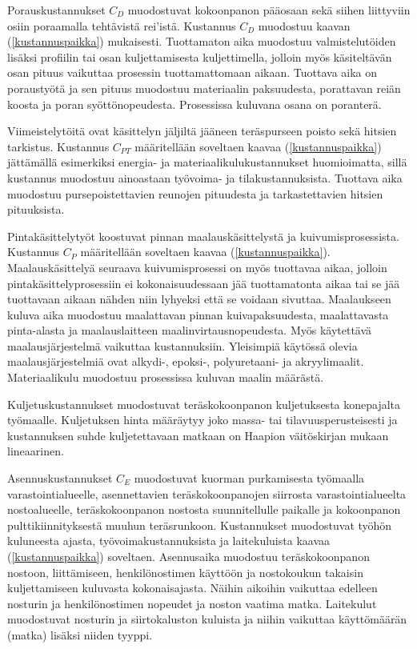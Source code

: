 \documentclass[12pt]{article}
\newenvironment{content}{\pagenumbering{arabic}}{}
\begin{document}
\begin{content}
Porauskustannukset $C_D$ muodostuvat kokoonpanon pääosaan sekä siihen liittyviin osiin poraamalla tehtävistä rei'istä. Kustannus $C_D$ muodostuu kaavan (\ref{kustannuspaikka}) mukaisesti. Tuottamaton aika muodostuu valmistelutöiden lisäksi profiilin tai osan kuljettamisesta kuljettimella, jolloin myös käsiteltävän osan pituus vaikuttaa prosessin tuottamattomaan aikaan. Tuottava aika on poraustyötä ja sen pituus muodostuu materiaalin paksuudesta, porattavan reiän koosta ja poran syöttönopeudesta. Prosessissa kuluvana osana on poranterä.

Viimeistelytöitä ovat käsittelyn jäljiltä jääneen teräspurseen poisto sekä hitsien tarkistus. Kustannus $C_{PT}$ määritellään soveltaen kaavaa (\ref{kustannuspaikka}) jättämällä esimerkiksi energia- ja materiaalikulukustannukset huomioimatta, sillä kustannus muodostuu ainoastaan työvoima- ja tilakustannuksista. Tuottava aika muodostuu pursepoistettavien reunojen pituudesta ja tarkastettavien hitsien pituuksista. 

Pintakäsittelytyöt koostuvat pinnan maalauskäsittelystä ja kuivumisprosessista. Kustannus $C_P$ määritellään soveltaen kaavaa (\ref{kustannuspaikka}). Maalauskäsittelyä seuraava kuivumisprosessi on myös tuottavaa aikaa, jolloin pintakäsittelyprosessiin ei kokonaisuudessaan jää tuottamatonta aikaa tai se jää tuottavaan aikaan nähden niin lyhyeksi että se voidaan sivuttaa. Maalaukseen kuluva aika muodostuu maalattavan pinnan kuivapaksuudesta, maalattavasta pinta-alasta ja maalauslaitteen maalinvirtausnopeudesta. Myös käytettävä maalausjärjestelmä vaikuttaa kustannuksiin. Yleisimpiä käytössä olevia maalausjärjestelmiä ovat alkydi-, epoksi-, polyuretaani- ja akryylimaalit.  Materiaalikulu muodostuu prosessissa kuluvan maalin määrästä. 

Kuljetuskustannukset muodostuvat teräskokoonpanon kuljetuksesta konepajalta työmaalle. Kuljetuksen hinta määräytyy joko massa- tai tilavuusperusteisesti ja kustannuksen suhde kuljetettavaan matkaan on Haapion väitöskirjan mukaan lineaarinen. 

Asennuskustannukset $C_E$ muodostuvat kuorman purkamisesta työmaalla varastointialueelle, asennettavien teräskokoonpanojen siirrosta varastointialueelta nostoalueelle, teräskokoonpanon nostosta suunnitellulle paikalle ja kokoonpanon pulttikiinnityksestä muuhun teräsrunkoon. Kustannukset muodostuvat työhön kuluneesta ajasta, työvoimakustannuksista ja laitekuluista kaavaa (\ref{kustannuspaikka}) soveltaen. Asennusaika muodostuu teräskokoonpanon nostoon, liittämiseen, henkilönostimen käyttöön ja nostokoukun takaisin kuljettamiseen kuluvasta kokonaisajasta. Näihin aikoihin vaikuttaa edelleen nosturin ja henkilönostimen nopeudet ja noston vaatima matka.  Laitekulut muodostuvat nosturin ja siirtokaluston kuluista ja niihin vaikuttaa käyttömäärän (matka) lisäksi niiden tyyppi. 














\end{content}
\end{document}
